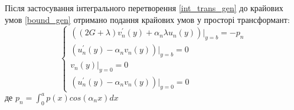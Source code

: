 Після застосування інтегрального перетворення \eqref{int_trans_gen} до крайових умов \eqref{bound_gen}
отримано подання крайових умов у просторі трансформант:
\begin{equation}\label{transf_bound_gen}
    \begin{cases}
        \left( (2G + \lambda)v_n^{'}(y) + \alpha_n \lambda u_n(y) \right)|_{y=b} = -p_n \\
        \left(u_n^{'}(y) - \alpha_n v_n(y)  \right)|_{y=b} = 0 \\
        v_n(y)|_{y=0} = 0 \\
        \left(u_n^{'}(y) - \alpha_n v_n(y)  \right)|_{y=0} = 0
    \end{cases}
\end{equation}
де $p_n = \int_{0}^{a} p(x) cos(\alpha_n x) dx$



